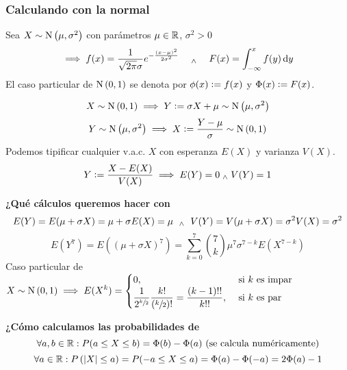 \subsubsection{Calculando con la normal }
Sea $X\sim\operatorname{N}\left(\mu, \sigma^2\right)$ con parámetros $\mu\in\mathbb{R}$, $\sigma^2>0$\
\[\implies f(x) = \frac{1}{\sqrt{2\pi}\sigma} e^{-\frac{(x-\mu)^2}{2\sigma^2}} \quad \we \quad F(x) = \int_{-\infty}^{x} f(y) \odif{y}\]
El caso particular de $\operatorname{N}\left(0, 1\right)$ se denota por $\phi(x) \vcentcolon= f(x)$ y $\Phi(x)\vcentcolon= F(x)$.
\begin{center}
\end{center}

\[X\sim\operatorname{N}\left(0, 1\right) \implies Y\vcentcolon=\sigma X + \mu \sim \operatorname{N}\left(\mu, \sigma^2\right)\]
\[Y\sim\operatorname{N}\left(\mu, \sigma^2\right) \implies X\vcentcolon= \frac{Y-\mu}{\sigma} \sim \operatorname{N}\left(0, 1\right)\]
Podemos tipificar cualquier v.a.c. $X$ con esperanza $E(X)$ y varianza $V(X)$.
\[Y\vcentcolon= \frac{X-E(X)}{V(X)} \implies E(Y) = 0 \; _{\wedge} \; V(Y) = 1\]

\textbf{¿Qué cálculos queremos hacer con }
\[E(Y) = E(\mu + \sigma X) = \mu + \sigma E(X) = \mu\, \,\; _{\wedge} \;\, \, V(Y) = V(\mu + \sigma X) = \sigma^2 V(X) = \sigma^2\]
\[E\left(Y^7\right) = E\left(\left(\mu + \sigma X\right)^7\right) = \sum_{k=0}^7 \binom{7}{k} \mu^7 \sigma^{7-k} E(X^{7-k})\]
Caso particular de $X\sim \operatorname{N}\left(0,1\right) \implies \displaystyle E(X^k) = \begin{cases}
		0,                                                                                          & \text{ si } k \text{ es impar} \\
		\displaystyle \frac{1}{2^{\sfrac{k}{2}}} \frac{k!}{\left(\sfrac{k}{2}\right)!} = \frac{(k-1)!!}{k!!}, & \text{ si } k \text{ es par}
	\end{cases}$

\textbf{¿Cómo calculamos las probabilidades de }
\[\forall a, b \in \mathbb{R} : P(a\leq X \leq b) = \Phi(b) - \Phi(a) \text{ (se calcula numéricamente)}\]
\[\forall a \in \mathbb{R} : P\left(\left|X\right| \leq a\right) = P(-a \leq X\leq a) = \Phi(a) - \Phi(-a) = 2\Phi(a) - 1\]

